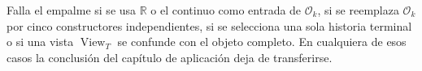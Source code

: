\begin{falsifier}
Falla el empalme si se usa \(\mathbb R\) o el continuo como entrada de
\(\mathcal O_k\), si se reemplaza \(\mathcal O_k\) por cinco constructores
independientes, si se selecciona una sola historia terminal o si una vista
\(\operatorname{View}_T\) se confunde con el objeto completo. En cualquiera
de esos casos la conclusión del capítulo de aplicación deja de transferirse.
\end{falsifier}
